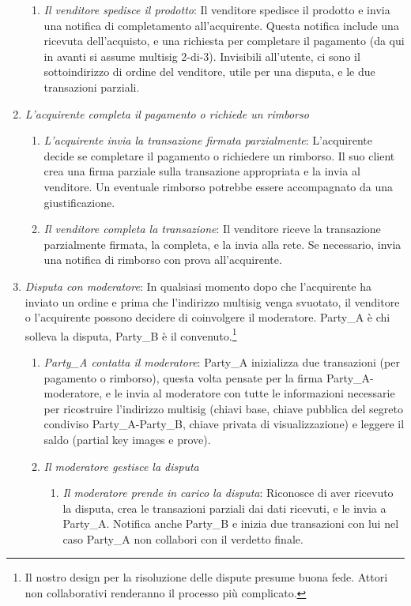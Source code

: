 \begin{enumerate}
\begin{enumerate}
        \item {\em Il venditore spedisce il prodotto}: Il venditore spedisce il prodotto e invia una notifica di completamento all'acquirente. Questa notifica include una ricevuta dell'acquisto, e una richiesta per completare il pagamento (da qui in avanti si assume multisig 2-di-3). Invisibili all’utente, ci sono il sottoindirizzo di ordine del venditore, utile per una disputa, e le due transazioni parziali.
    \end{enumerate}{}    
    \item {\em L'acquirente completa il pagamento o richiede un rimborso}
    \begin{enumerate}
        \item {\em L'acquirente invia la transazione firmata parzialmente}: L'acquirente decide se completare il pagamento o richiedere un rimborso. Il suo client crea una firma parziale sulla transazione appropriata e la invia al venditore. Un eventuale rimborso potrebbe essere accompagnato da una giustificazione.        
        \item {\em Il venditore completa la transazione}: Il venditore riceve la transazione parzialmente firmata, la completa, e la invia alla rete. Se necessario, invia una notifica di rimborso con prova all'acquirente.
    \end{enumerate}{}
    \item {\em Disputa con moderatore}: In qualsiasi momento dopo che l'acquirente ha inviato un ordine e prima che l'indirizzo multisig venga svuotato, il venditore o l'acquirente possono decidere di coinvolgere il moderatore. Party\_A è chi solleva la disputa, Party\_B è il convenuto.\footnote{Il nostro design per la risoluzione delle dispute presume buona fede. Attori non collaborativi renderanno il processo più complicato.}    
    \begin{enumerate}
        \item {\em Party\_A contatta il moderatore}: Party\_A inizializza due transazioni (per pagamento o rimborso), questa volta pensate per la firma Party\_A-moderatore, e le invia al moderatore con tutte le informazioni necessarie per ricostruire l’indirizzo multisig (chiavi base, chiave pubblica del segreto condiviso Party\_A-Party\_B, chiave privata di visualizzazione) e leggere il saldo (partial key images e prove).        
        \item {\em Il moderatore gestisce la disputa}
        \begin{enumerate}
            \item {\em Il moderatore prende in carico la disputa}: Riconosce di aver ricevuto la disputa, crea le transazioni parziali dai dati ricevuti, e le invia a Party\_A. Notifica anche Party\_B e inizia due transazioni con lui nel caso Party\_A non collabori con il verdetto finale.

\end{enumerate}
\end{enumerate}
\end{enumerate}
